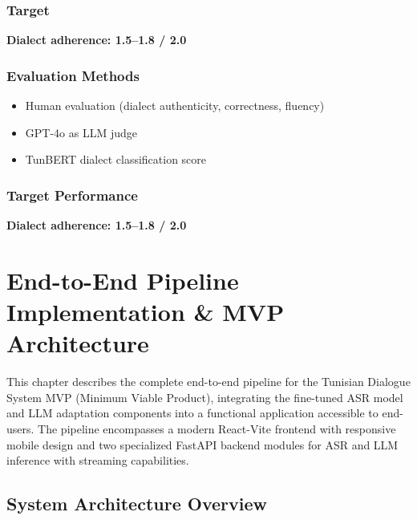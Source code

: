 \documentclass[12pt,a4paper]{report}
\begin{document}
\subsection{Target}

\begin{center}
\textbf{Dialect adherence: 1.5--1.8 / 2.0}
\end{center}

\subsection{Evaluation Methods}

\begin{itemize}
    \item Human evaluation (dialect authenticity, correctness, fluency)
    \item GPT-4o as LLM judge
    \item TunBERT dialect classification score
\end{itemize}

\subsection{Target Performance}

\begin{center}
\textbf{Dialect adherence: 1.5--1.8 / 2.0}
\end{center}

\chapter{End-to-End Pipeline Implementation \& MVP Architecture}

This chapter describes the complete end-to-end pipeline for the Tunisian Dialogue System MVP (Minimum Viable Product), integrating the fine-tuned ASR model and LLM adaptation components into a functional application accessible to end-users. The pipeline encompasses a modern React-Vite frontend with responsive mobile design and two specialized FastAPI backend modules for ASR and LLM inference with streaming capabilities.

\section{System Architecture Overview}
\end{document}
